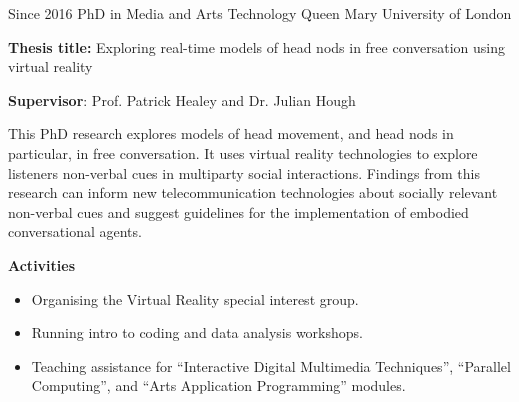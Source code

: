 \documentclass[]{friggeri-cv}
\begin{document}
\begin{entrylist}

    \entry
    {Since 2016}
    {PhD in Media and Arts Technology}
    {Queen Mary University of London}
    {
      \textbf{Thesis title:} Exploring real-time models of head nods in free conversation using virtual reality

      \textbf{Supervisor}: Prof. Patrick Healey and Dr. Julian Hough

      This PhD research explores models of head movement, and head nods in particular, in free conversation.
      It uses virtual reality technologies to explore listeners non-verbal cues in multiparty social interactions.
      Findings from this research can inform new telecommunication technologies about socially relevant non-verbal cues and suggest guidelines for the implementation of embodied conversational agents.

      \textbf{Activities}
      \begin{itemize}
        \item
          Organising the Virtual Reality special interest group.
        \item
          Running intro to coding and data analysis workshops.
	\item
	  Teaching assistance for ``Interactive Digital Multimedia Techniques'', ``Parallel Computing'', and ``Arts Application Programming'' modules.
      \end{itemize}
    }

\end{entrylist}
\end{document}
